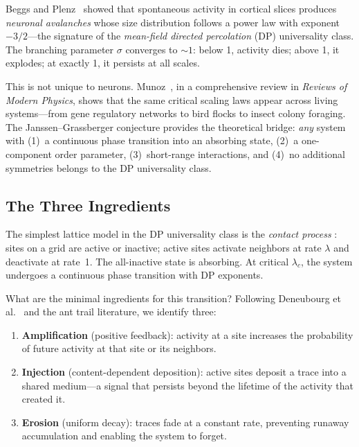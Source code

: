 \documentclass[11pt,a4paper]{article}
\begin{document}
Beggs and Plenz~\cite{beggs2003} showed that spontaneous activity in
cortical slices produces \emph{neuronal avalanches} whose size
distribution follows a power law with exponent $-3/2$---the signature
of the \emph{mean-field directed percolation} (DP) universality
class.  The branching parameter $\sigma$ converges to $\sim\!1$:
below 1, activity dies; above 1, it explodes; at exactly 1, it
persists at all scales.

This is not unique to neurons.  Munoz~\cite{munoz2018}, in a
comprehensive review in \emph{Reviews of Modern Physics}, shows that
the same critical scaling laws appear across living systems---from
gene regulatory networks to bird flocks to insect colony foraging.
The Janssen--Grassberger conjecture \cite{janssen1981,grassberger1982}
provides the theoretical bridge: \emph{any} system with (1)~a
continuous phase transition into an absorbing state, (2)~a
one-component order parameter, (3)~short-range interactions, and
(4)~no additional symmetries belongs to the DP universality class.

\subsection{The Three Ingredients}

The simplest lattice model in the DP universality class is the
\emph{contact process} \cite{harris1974}: sites on a grid are active
or inactive; active sites activate neighbors at rate $\lambda$ and
deactivate at rate~1.  The all-inactive state is absorbing.  At
critical $\lambda_c$, the system undergoes a continuous phase
transition with DP exponents.

What are the minimal ingredients for this transition?  Following
Deneubourg et al.~\cite{deneubourg1990} and the ant trail literature,
we identify three:

\begin{enumerate}
    \item \textbf{Amplification} (positive feedback): activity at a
          site increases the probability of future activity at that
          site or its neighbors.
    \item \textbf{Injection} (content-dependent deposition): active
          sites deposit a trace into a shared medium---a signal that
          persists beyond the lifetime of the activity that created it.
    \item \textbf{Erosion} (uniform decay): traces fade at a constant
          rate, preventing runaway accumulation and enabling the system
          to forget.
\end{enumerate}
\end{document}
